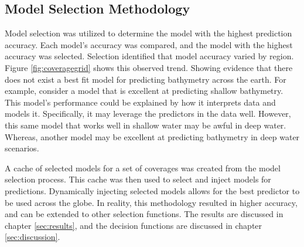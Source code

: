 \subsection{Model Selection Methodology}
Model selection was utilized to determine the model with the highest prediction accuracy.
Each model's accuracy was compared, and the model with the highest accuracy was selected.
Selection identified that model accuracy varied by region.
Figure \ref{fig:coveragegrid} shows this observed trend.
Showing evidence that there does not exist a best fit model for predicting bathymetry across the earth.
For example, consider a model that is excellent at predicting shallow bathymetry.
This model's performance could be explained by how it interprets data and models it.
Specifically, it may leverage the predictors in the data well.
However, this same model that works well in shallow water may be awful in deep water.
Whereas, another model may be excellent at predicting bathymetry in deep water scenarios.

\par
A cache of selected models for a set of coverages was created from the model selection process.
This cache was then used to select and inject models for predictions. 
Dynamically injecting selected models allows for the best predictor to be used across the globe.
In reality, this methodology resulted in higher accuracy, and can be extended to other selection functions.
The results are discussed in chapter \ref{sec:results}, and the decision functions are discussed in chapter \ref{sec:discussion}.

